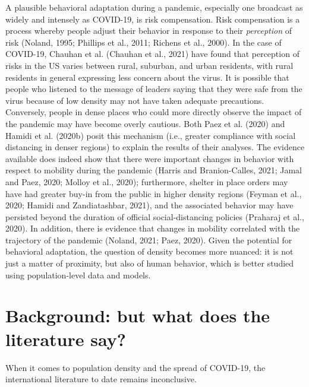 \documentclass[]{elsarticle} %
\begin{document}
A plausible behavioral adaptation during a pandemic, especially one
broadcast as widely and intensely as COVID-19, is risk compensation.
Risk compensation is a process whereby people adjust their behavior in
response to their \emph{perception} of risk (Noland, 1995; Phillips et
al., 2011; Richens et al., 2000). In the case of COVID-19, Chauhan et
al. (Chauhan et al., 2021) have found that perception of risks in the US
varies between rural, suburban, and urban residents, with rural
residents in general expressing less concern about the virus. It is
possible that people who listened to the message of leaders saying that
they were safe from the virus because of low density may not have taken
adequate precautions. Conversely, people in dense places who could more
directly observe the impact of the pandemic may have become overly
cautious. Both Paez et al. (2020) and Hamidi et al. (2020b) posit this
mechanism (i.e., greater compliance with social distancing in denser
regions) to explain the results of their analyses. The evidence
available does indeed show that there were important changes in behavior
with respect to mobility during the pandemic (Harris and Branion-Calles,
2021; Jamal and Paez, 2020; Molloy et al., 2020); furthermore, shelter
in place orders may have had greater buy-in from the public in higher
density regions (Feyman et al., 2020; Hamidi and Zandiatashbar, 2021),
and the associated behavior may have persisted beyond the duration of
official social-distancing policies (Praharaj et al., 2020). In
addition, there is evidence that changes in mobility correlated with the
trajectory of the pandemic (Noland, 2021; Paez, 2020). Given the
potential for behavioral adaptation, the question of density becomes
more nuanced: it is not just a matter of proximity, but also of human
behavior, which is better studied using population-level data and
models.

\hypertarget{background-but-what-does-the-literature-say}{%
\section{Background: but what does the literature
say?}\label{background-but-what-does-the-literature-say}}

When it comes to population density and the spread of COVID-19, the
international literature to date remains inconclusive.
\end{document}
